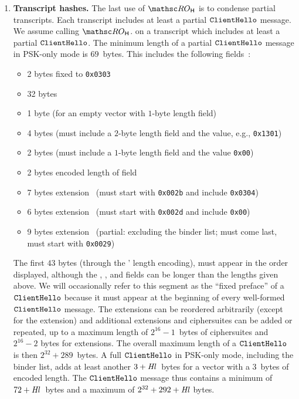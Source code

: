 \begin{enumerate}
	\item \textbf{Transcript hashes.} The last use of $\ROhash$ is to condense partial transcripts. 
	Each transcript includes at least a partial $\mathtt{ClientHello}$ message.
	We assume calling $\ROhash$. on a transcript which includes at least a partial $\mathtt{ClientHello}$.
	The minimum length of a partial $\mathtt{ClientHello}$ message in PSK-only mode is $69$~bytes.
	This includes the following fields~\cite[Section~4.1.2]{rfc8446}:
	\begin{itemize}
		\item 2 bytes  fixed to \texttt{0x0303}
		\item 32 bytes 
		\item 1 byte  (for an empty vector with $1$-byte length field)
		\item 4 bytes  (must include a $2$-byte length field and the value, e.g., \texttt{0x1301})
		\item 2 bytes  (must include a $1$-byte length field and the value \texttt{0x00})
		\item 2 bytes encoded length of  field
		\item 7 bytes  extension~\cite[Section~4.2.1]{rfc8446} (must start with \texttt{0x002b} and include \texttt{0x0304})
		\item 6 bytes  extension~\cite[Section~4.2.9]{rfc8446} (must start with \texttt{0x002d} and include \texttt{0x00})
		\item 9 bytes  extension~\cite[Section~4.2.11]{rfc8446} (partial: excluding the binder list; must come last, must start with \texttt{0x0029})
	\end{itemize}
	The first $43$ bytes (through the ' length encoding), must appear in the order displayed, although the , , and  fields can be longer than the lengths given above. 
	We will occasionally refer to this segment as the ``fixed preface'' of a $\mathtt{ClientHello}$ because it must appear at the beginning of every well-formed $\mathtt{ClientHello}$ message. 
	The extensions can be reordered arbitrarily (except for the  extension) and additional extensions and ciphersuites can be added or repeated, up to a maximum length of $2^{16}-1$~bytes of ciphersuites and $2^{16}-2$ bytes for extensions. The overall maximum length of a $\mathtt{ClientHello}$ is then $2^{32} + 289$~bytes.
	A full $\mathtt{ClientHello}$ in PSK-only mode, including the binder list, adds at least another $3+\mathit{Hl}$~bytes for a  vector with a $3$~bytes of encoded length. The $\mathtt{ClientHello}$ message thus contains a minimum of $72+\mathit{Hl}$~bytes and a maximum of $2^{32}+292+\mathit{Hl}$ bytes.
		

\end{enumerate}
